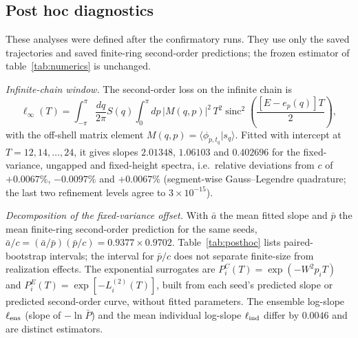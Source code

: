 \documentclass[12pt,a4paper]{article}
\theoremstyle{remark}
\newcommand{\sinc}{\operatorname{sinc}}
\begin{document}
\subsection{Post hoc diagnostics}\label{app:posthoc}

These analyses were defined after the confirmatory runs. They use only the saved trajectories and saved finite-ring second-order predictions; the frozen estimator of table~\ref{tab:numerics} is unchanged.

\emph{Infinite-chain window.} The second-order loss on the infinite chain is
\begin{equation}
\ell_\infty(T)=\int_{-\pi}^{\pi}\frac{dq}{2\pi}S(q)\int_0^\pi dp\,|M(q,p)|^2\,T^2\sinc^2\!\left(\frac{[E-e_p(q)]T}{2}\right),
\end{equation}
with the off-shell matrix element $M(q,p)=\langle\phi_{p,t_q}|s_q\rangle$. Fitted with intercept at $T=12,14,\dots,24$, it gives slopes $2.01348$, $1.06103$ and $0.402696$ for the fixed-variance, ungapped and fixed-height spectra, i.e.\ relative deviations from $c$ of $+0.0067\%$, $-0.0097\%$ and $+0.0067\%$ (segment-wise Gauss--Legendre quadrature; the last two refinement levels agree to $3\times10^{-15}$).

\emph{Decomposition of the fixed-variance offset.} With $\bar a$ the mean fitted slope and $\bar p$ the mean finite-ring second-order prediction for the same seeds, $\bar a/c=(\bar a/\bar p)(\bar p/c)=0.9377\times0.9702$. Table~\ref{tab:posthoc} lists paired-bootstrap intervals; the interval for $\bar p/c$ does not separate finite-size from realization effects. The exponential surrogates are $P_i^{C}(T)=\exp(-W^2p_iT)$ and $P_i^{E}(T)=\exp[-L_i^{(2)}(T)]$, built from each seed's predicted slope or predicted second-order curve, without fitted parameters. The ensemble log-slope $\ell_{\rm ens}$ (slope of $-\ln\bar P$) and the mean individual log-slope $\ell_{\rm ind}$ differ by $0.0046$ and are distinct estimators.
\end{document}

